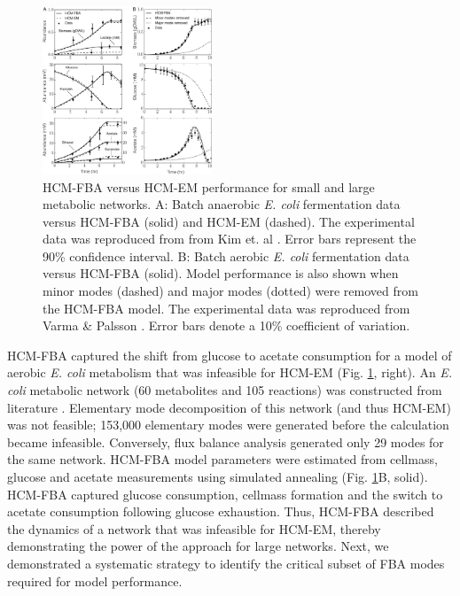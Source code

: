 \documentclass[10pt,twocolumn,twoside,final]{IEEEtran}
\begin{document}
\begin{figure}[!t]\centering
\includegraphics[width=0.45\textwidth]{./figs/Fig-2-Ecoli-SimulationResults.pdf}
\caption{HCM-FBA versus HCM-EM performance for small and large metabolic networks.
A: Batch anaerobic \textit{E. coli} fermentation data versus HCM-FBA (solid) and HCM-EM (dashed).
The experimental data was reproduced from from Kim et. al \cite{2008_kim_varner_ramkrishna_BiotechProg}. Error bars represent the 90\% confidence interval.
B: Batch aerobic \textit{E. coli} fermentation data versus HCM-FBA (solid).
Model performance is also shown when minor modes (dashed) and major modes (dotted) were removed from the HCM-FBA model.
The experimental data was reproduced from Varma \& Palsson \cite{1994_varma_palsson_ApplEnvMicro}. Error bars denote a 10\% coefficient of variation.}
\label{fig:ecoli}
\end{figure}

HCM-FBA captured the shift from glucose to acetate consumption for a model of aerobic \textit{E. coli} metabolism that was infeasible for HCM-EM (Fig. \ref{fig:ecoli}, right).
An \emph{E. coli} metabolic network (60 metabolites and 105 reactions) was constructed from literature \cite{2007_schuetz_etal_MolSysBio,2006_Palsson_model}.
Elementary mode decomposition of this network (and thus HCM-EM) was not feasible; 153,000 elementary modes were generated before the calculation became infeasible.
Conversely, flux balance analysis generated only 29 modes for the same network.
HCM-FBA model parameters were estimated from cellmass, glucose and acetate measurements \cite{1994_varma_palsson_ApplEnvMicro} using simulated annealing (Fig. \ref{fig:ecoli}B, solid).
HCM-FBA captured glucose consumption, cellmass formation and the switch to acetate consumption following glucose exhaustion.
Thus, HCM-FBA described the dynamics of a network that was infeasible for HCM-EM, thereby demonstrating the power of the approach for large networks.
Next, we demonstrated a systematic strategy to identify the critical subset of FBA modes required for model performance.
\end{document}
